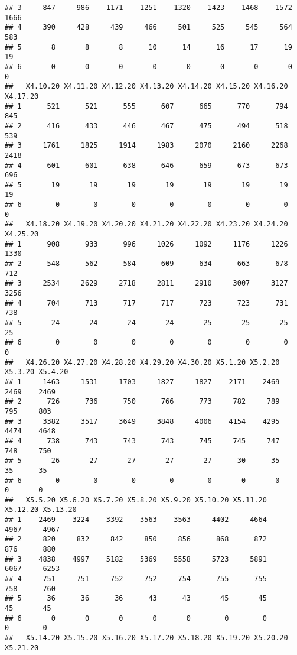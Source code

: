 \documentclass[
]{article}
\begin{document}
\begin{verbatim}
## 3     847     986    1171    1251    1320    1423    1468    1572    1666
## 4     390     428     439     466     501     525     545     564     583
## 5       8       8       8      10      14      16      17      19      19
## 6       0       0       0       0       0       0       0       0       0
##   X4.10.20 X4.11.20 X4.12.20 X4.13.20 X4.14.20 X4.15.20 X4.16.20 X4.17.20
## 1      521      521      555      607      665      770      794      845
## 2      416      433      446      467      475      494      518      539
## 3     1761     1825     1914     1983     2070     2160     2268     2418
## 4      601      601      638      646      659      673      673      696
## 5       19       19       19       19       19       19       19       19
## 6        0        0        0        0        0        0        0        0
##   X4.18.20 X4.19.20 X4.20.20 X4.21.20 X4.22.20 X4.23.20 X4.24.20 X4.25.20
## 1      908      933      996     1026     1092     1176     1226     1330
## 2      548      562      584      609      634      663      678      712
## 3     2534     2629     2718     2811     2910     3007     3127     3256
## 4      704      713      717      717      723      723      731      738
## 5       24       24       24       24       25       25       25       25
## 6        0        0        0        0        0        0        0        0
##   X4.26.20 X4.27.20 X4.28.20 X4.29.20 X4.30.20 X5.1.20 X5.2.20 X5.3.20 X5.4.20
## 1     1463     1531     1703     1827     1827    2171    2469    2469    2469
## 2      726      736      750      766      773     782     789     795     803
## 3     3382     3517     3649     3848     4006    4154    4295    4474    4648
## 4      738      743      743      743      745     745     747     748     750
## 5       26       27       27       27       27      30      35      35      35
## 6        0        0        0        0        0       0       0       0       0
##   X5.5.20 X5.6.20 X5.7.20 X5.8.20 X5.9.20 X5.10.20 X5.11.20 X5.12.20 X5.13.20
## 1    2469    3224    3392    3563    3563     4402     4664     4967     4967
## 2     820     832     842     850     856      868      872      876      880
## 3    4838    4997    5182    5369    5558     5723     5891     6067     6253
## 4     751     751     752     752     754      755      755      758      760
## 5      36      36      36      43      43       45       45       45       45
## 6       0       0       0       0       0        0        0        0        0
##   X5.14.20 X5.15.20 X5.16.20 X5.17.20 X5.18.20 X5.19.20 X5.20.20 X5.21.20

\end{verbatim}
\end{document}
